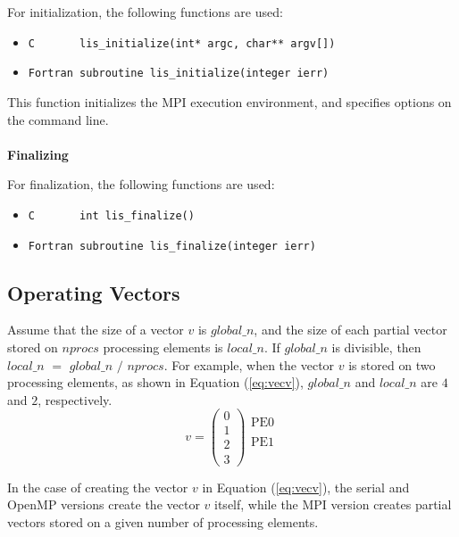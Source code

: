 \documentclass[a4paper]{article}
\begin{document}
For initialization, the following functions are used:
\begin{itemize}
\item \verb+C       lis_initialize(int* argc, char** argv[])+
\item \verb+Fortran subroutine lis_initialize(integer ierr)+
\end{itemize}
This function initializes the MPI execution environment, 
and specifies options on the command line.
\\ \\
\noindent
{\bf Finalizing}

For finalization, the following functions are used: 
\begin{itemize}
\item \verb+C       int lis_finalize()+
\item \verb+Fortran subroutine lis_finalize(integer ierr)+
\end{itemize}
\subsection{Operating Vectors}
Assume that the size of a vector $v$ is $global\_n$, and the size 
of each partial vector stored on $nprocs$ processing elements is $local\_n$. 
If $global\_n$ is divisible, 
then $local\_n$ $=$ $global\_n$ $/$ $nprocs$. 
For example, when the vector $v$ is stored on two processing elements, 
as shown in Equation (\ref{eq:vecv}), $global\_n$ and $local\_n$ 
are $4$ and $2$, respectively.
\begin{equation}
v = 
\left(
\begin{array}{c}
0 \\
1 \\ \hline
2 \\
3  
\end{array}
\right)
\begin{array}{l}
\mbox{PE0} \\
    \\
\mbox{PE1} \\
   \\ 
\end{array}
\label{eq:vecv}
\end{equation}

In the case of creating the vector $v$ in Equation (\ref{eq:vecv}), 
the serial and OpenMP versions create the vector $v$ itself, while 
the MPI version creates partial vectors stored on a given number of processing elements.
 
\end{document}
